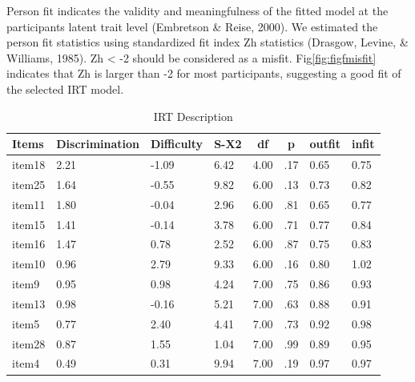 \documentclass[
  english,
  man]{apa6}
\begin{document}
Person fit indicates the validity and meaningfulness of the fitted model at the participants latent trait level (Embretson \& Reise, 2000). We estimated the person fit statistics using standardized fit index Zh statistics (Drasgow, Levine, \& Williams, 1985). Zh \textless{} -2 should be considered as a misfit. Fig\ref{fig:figfmisfit} indicates that Zh is larger than -2 for most participants, suggesting a good fit of the selected IRT model.

\begin{table}[tbp]

\begin{center}
\begin{threeparttable}

\caption{\label{tab:tabIRT}IRT Description}

\begin{tabular}{llllllll}
\toprule
Items & \multicolumn{1}{c}{Discrimination} & \multicolumn{1}{c}{Difficulty} & \multicolumn{1}{c}{S-X2} & \multicolumn{1}{c}{df} & \multicolumn{1}{c}{p} & \multicolumn{1}{c}{outfit} & \multicolumn{1}{c}{infit}\\
\midrule
item18 & 2.21 & -1.09 & 6.42 & 4.00 & .17 & 0.65 & 0.75\\
item25 & 1.64 & -0.55 & 9.82 & 6.00 & .13 & 0.73 & 0.82\\
item11 & 1.80 & -0.04 & 2.96 & 6.00 & .81 & 0.65 & 0.77\\
item15 & 1.41 & -0.14 & 3.78 & 6.00 & .71 & 0.77 & 0.84\\
item16 & 1.47 & 0.78 & 2.52 & 6.00 & .87 & 0.75 & 0.83\\
item10 & 0.96 & 2.79 & 9.33 & 6.00 & .16 & 0.80 & 1.02\\
item9 & 0.95 & 0.98 & 4.24 & 7.00 & .75 & 0.86 & 0.93\\
item13 & 0.98 & -0.16 & 5.21 & 7.00 & .63 & 0.88 & 0.91\\
item5 & 0.77 & 2.40 & 4.41 & 7.00 & .73 & 0.92 & 0.98\\
item28 & 0.87 & 1.55 & 1.04 & 7.00 & .99 & 0.89 & 0.95\\
item4 & 0.49 & 0.31 & 9.94 & 7.00 & .19 & 0.97 & 0.97\\
\bottomrule
\end{tabular}

\end{threeparttable}
\end{center}

\end{table}
\end{document}
